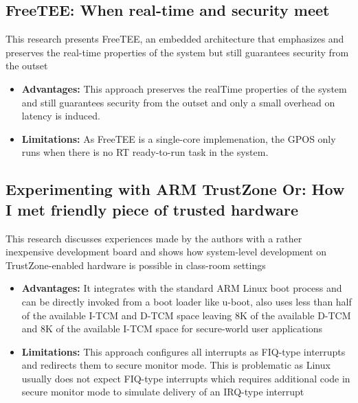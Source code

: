 \documentclass[conference]{IEEEtran}
\begin{document}
\subsection{FreeTEE: When real-time and security meet}
\cite{emb5} This research presents FreeTEE, an embedded architecture that emphasizes and preserves the real-time properties of the system but still guarantees security from the outset
\begin{itemize}
    \item \textbf{Advantages:} This approach preserves the realTime properties of the system and still guarantees security from the outset and only a small overhead on latency is induced.
    \item \textbf{Limitations:} As FreeTEE is a single-core implemenation, the GPOS only runs when there is no RT ready-to-run task in the system.
\end{itemize}


\subsection{Experimenting with ARM TrustZone Or: How I met friendly piece of trusted hardware}
\cite{emb6} This research discusses experiences made by the authors with a rather inexpensive development board and shows how system-level development on TrustZone-enabled hardware is possible in class-room settings
\begin{itemize}
    \item \textbf{Advantages:} It integrates with the standard ARM Linux boot process and can be directly invoked from a boot loader like u-boot, also uses less than half of the available I-TCM and D-TCM space leaving 8K of the available D-TCM and 8K of the available I-TCM space for secure-world user applications
    \item \textbf{Limitations:} This approach configures all interrupts as FIQ-type interrupts and redirects them to secure monitor mode. This is problematic as Linux usually does not expect FIQ-type interrupts which requires additional code in secure monitor mode to simulate delivery of an IRQ-type interrupt
\end{itemize}
\end{document}
